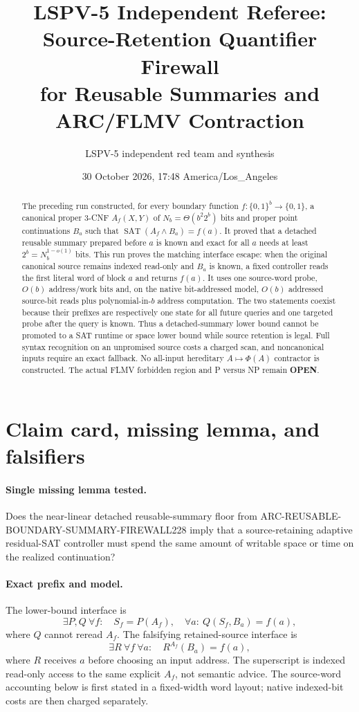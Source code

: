 \documentclass[11pt]{article}
\title{LSPV-5 Independent Referee: Source-Retention Quantifier Firewall\\
for Reusable Summaries and ARC/FLMV Contraction}
\author{LSPV-5 independent red team and synthesis}
\date{30 October 2026, 17:48 America/Los\_Angeles}
\newcommand{\OPEN}{\textbf{OPEN}}
\begin{document}
\maketitle

\begin{abstract}
The preceding run constructed, for every boundary function
$f:\{0,1\}^b\to\{0,1\}$, a canonical proper 3-CNF $A_f(X,Y)$ of
$N_b=\Theta(b^2 2^b)$ bits and proper point continuations $B_a$ such that
$\operatorname{SAT}(A_f\wedge B_a)=f(a)$.  It proved that a detached reusable
summary prepared before $a$ is known and exact for all $a$ needs at least
$2^b=N_b^{1-o(1)}$ bits.  This run proves the matching interface escape:
when the original canonical source remains indexed read-only and $B_a$ is
known, a fixed controller reads the first literal word of block $a$ and
returns $f(a)$.  It uses one source-word probe, $O(b)$ address/work bits and,
on the native bit-addressed model, $O(b)$ addressed source-bit reads plus
polynomial-in-$b$ address computation.  The two statements coexist because
their prefixes are respectively one state for all future queries and one
targeted probe after the query is known.  Thus a detached-summary lower bound
cannot be promoted to a SAT runtime or space lower bound while source retention
is legal.  Full syntax recognition on an unpromised source costs a charged
scan, and noncanonical inputs require an exact fallback.  No all-input
hereditary $A\mapsto\Phi(A)$ contractor is constructed.  The actual FLMV
forbidden region and P versus NP remain \OPEN.
\end{abstract}

\section{Claim card, missing lemma, and falsifiers}
\paragraph{Single missing lemma tested.}
Does the near-linear detached reusable-summary floor from
ARC-REUSABLE-BOUNDARY-SUMMARY-FIREWALL228 imply that a source-retaining
adaptive residual-SAT controller must spend the same amount of writable space
or time on the realized continuation?

\paragraph{Exact prefix and model.}
The lower-bound interface is
\[
 \exists P,Q\ \forall f:\quad S_f=P(A_f),\quad
 \forall a:\ Q(S_f,B_a)=f(a),
\]
where $Q$ cannot reread $A_f$.  The falsifying retained-source interface is
\[
 \exists R\ \forall f\ \forall a:\quad
 R^{A_f}(B_a)=f(a),
\]
where $R$ receives $a$ before choosing an input address.  The superscript is
indexed read-only access to the same explicit $A_f$, not semantic advice.
The source-word accounting below is first stated in a fixed-width word layout;
native indexed-bit costs are then charged separately.
\end{document}
